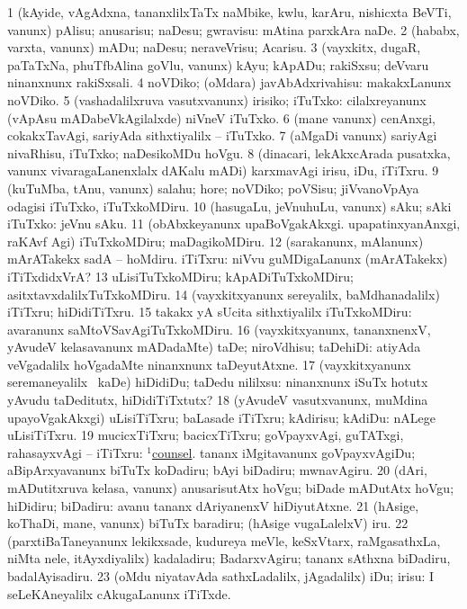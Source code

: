 \noindent
\gl{\sakirx}
\bmng
\bnum
\num{1} (kAyide, vAgAdxna, tananxlilxTaTx naMbike, kwlu, karAru, nishicxta BeVTi, \mo vanunx) pAlisu; anusarisu; naDesu; gwravisu:  mAtina parxkAra naDe. 
\num{2} (hababx, varxta, \mo vanunx) mADu; naDesu; neraveVrisu; Acarisu. 
\num{3} (vayxkitx, dugaR, paTaTxNa, phuTfbAlina goVlu, \mo vanunx) kAyu; kApADu; rakiSxsu;  deVvaru ninanxnunx rakiSxsali. 
\num{4} noVDiko; (oMdara) javAbAdxrivahisu:  makakxLanunx noVDiko. 
\num{5} (vashadalilxruva vasutxvanunx) irisiko; iTuTxko:  cilalxreyanunx (vApAsu mADabeVkAgilalxde) niVneV iTuTxko. 
\num{6} (mane \mo vanunx) cenAnxgi, cokakxTavAgi, sariyAda sithxtiyalilx -- iTuTxko. 
\num{7} (aMgaDi \mo vanunx) sariyAgi nivaRhisu, iTuTxko; naDesikoMDu hoVgu. 
\num{8} (dinacari, lekAkxcArada pusatxka, \mo vanunx vivaragaLanenxlalx dAKalu mADi) karxmavAgi irisu, iDu, iTiTxru. 
\num{9} (kuTuMba, tAnu, \mo vanunx) salahu; hore; noVDiko; poVSisu; jiVvanoVpAya odagisi iTuTxko, iTuTxkoMDiru. 
\num{10} (hasugaLu, jeVnuhuLu, \mo vanunx) sAku; sAki iTuTxko:  jeVnu sAku. 
\num{11} (obAbxkeyanunx upaBoVgakAkxgi. upapatinxyanAnxgi, raKAvf Agi) iTuTxkoMDiru; maDagikoMDiru. 
\num{12} (sarakanunx, mAlanunx) mArATakekx sadA -- hoMdiru. iTiTxru:  niVvu guMDigaLanunx (mArATakekx) iTiTxdidxVrA? 
\num{13} uLisiTuTxkoMDiru; kApADiTuTxkoMDiru; asitxtavxdalilxTuTxkoMDiru. 
\num{14} (vayxkitxyanunx sereyalilx, baMdhanadalilx) iTiTxru; hiDidiTiTxru. 
\num{15} takakx yA sUcita sithxtiyalilx iTuTxkoMDiru:  avaranunx saMtoVSavAgiTuTxkoMDiru. 
\num{16} (vayxkitxyanunx, tananxnenxV, yAvudeV kelasavanunx mADadaMte) taDe; niroVdhisu; taDehiDi:  atiyAda veVgadalilx hoVgadaMte ninanxnunx taDeyutAtxne. 
\num{17} (vayxkitxyanunx seremaneyalilx \mo\ kaDe) hiDidiDu; taDedu nililxsu:  ninanxnunx iSuTx hotutx yAvudu taDeditutx, hiDidiTiTxtutx? 
\num{18} (yAvudeV vasutxvanunx, muMdina upayoVgakAkxgi) uLisiTiTxru; baLasade iTiTxru; kAdirisu; kAdiDu:  nALege uLisiTiTxru. 
\hypertarget{keep(19)}{} 
\num{19} mucicxTiTxru; bacicxTiTxru; goVpayxvAgi, guTATxgi, rahasayxvAgi -- iTiTxru:  \hyperref{kandict_c.pdf}{C}{counsel(1) nuga(2)}{$^1$counsel}. tananx iMgitavanunx goVpayxvAgiDu; aBipArxyavanunx biTuTx koDadiru; bAyi biDadiru; mwnavAgiru. 
\num{20} (dAri, mADutitxruva kelasa, \mo vanunx) anusarisutAtx hoVgu; biDade mADutAtx hoVgu; hiDidiru; biDadiru:  avanu tananx dAriyanenxV hiDiyutAtxne. 
\num{21} (hAsige, koThaDi, mane, \mo vanunx) biTuTx baradiru; (hAsige \mo vugaLalelxV) iru. 
\num{22} (parxtiBaTaneyanunx lekikxsade, kudureya meVle, keSxVtarx, raMgasathxLa, niMta nele, itAyxdiyalilx) kadaladiru; BadarxvAgiru; tananx sAthxna biDadiru, badalAyisadiru. 
\num{23} (oMdu niyatavAda sathxLadalilx, jAgadalilx) iDu; irisu:  I seLeKAneyalilx cAkugaLanunx iTiTxde. 
\enum
\emng

